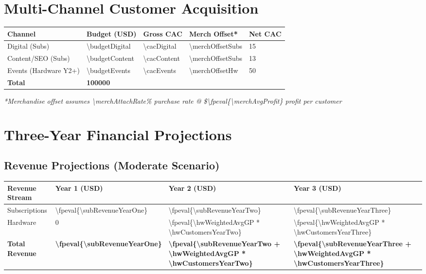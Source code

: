 \documentclass[11pt]{article}
\newcommand{\numfpeval}[1]{\num{\fpeval{#1}}}
\begin{document}
\section{Multi-Channel Customer Acquisition}

\begin{table}[H]
\centering
\begin{tabularx}{\linewidth}{l Y Y Y Y}
\toprule
Channel & Budget (USD) & Gross CAC\cite{authoranalysis2024} & Merch Offset* & Net CAC \\\midrule
Digital (Subs) & \num{\budgetDigital} & \num{\cacDigital} & \num{\merchOffsetSubs} & \num{15} \\
Content/SEO (Subs) & \num{\budgetContent} & \num{\cacContent} & \num{\merchOffsetSubs} & \num{13} \\
Events (Hardware Y2+) & \num{\budgetEvents} & \num{\cacEvents} & \num{\merchOffsetHw} & \num{50} \\\midrule
\textbf{Total} & \textbf{\num{100000}} &  &  &  \\
\bottomrule
\end{tabularx}
\end{table}
\textit{*Merchandise offset assumes \num{\merchAttachRate}\% purchase rate @ \$\numfpeval{\merchAvgProfit} profit per customer}

\section{Three-Year Financial Projections}

\subsection{Revenue Projections (Moderate Scenario)}
\begin{table}[H]
\centering
\begin{tabularx}{\linewidth}{l Y Y Y}
\toprule
Revenue Stream & Year 1 (USD) & Year 2 (USD) & Year 3 (USD) \\\midrule
Subscriptions & \numfpeval{\subRevenueYearOne} & \numfpeval{\subRevenueYearTwo} & \numfpeval{\subRevenueYearThree} \\
Hardware & \num{0} & \numfpeval{\hwWeightedAvgGP * \hwCustomersYearTwo} & \numfpeval{\hwWeightedAvgGP * \hwCustomersYearThree} \\\midrule
\textbf{Total Revenue} & \textbf{\numfpeval{\subRevenueYearOne}} & \textbf{\numfpeval{\subRevenueYearTwo + \hwWeightedAvgGP * \hwCustomersYearTwo}} & \textbf{\numfpeval{\subRevenueYearThree + \hwWeightedAvgGP * \hwCustomersYearThree}} \\
\bottomrule
\end{tabularx}
\end{table}
\end{document}
